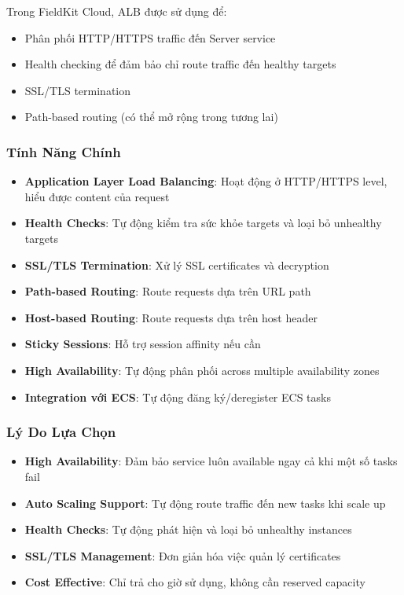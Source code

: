 Trong FieldKit Cloud, ALB được sử dụng để:
\begin{itemize}
    \item Phân phối HTTP/HTTPS traffic đến Server service
    \item Health checking để đảm bảo chỉ route traffic đến healthy targets
    \item SSL/TLS termination
    \item Path-based routing (có thể mở rộng trong tương lai)
\end{itemize}

\subsubsection{Tính Năng Chính}

\begin{itemize}
    \item \textbf{Application Layer Load Balancing}: Hoạt động ở HTTP/HTTPS level, hiểu được content của request
    \item \textbf{Health Checks}: Tự động kiểm tra sức khỏe targets và loại bỏ unhealthy targets
    \item \textbf{SSL/TLS Termination}: Xử lý SSL certificates và decryption
    \item \textbf{Path-based Routing}: Route requests dựa trên URL path
    \item \textbf{Host-based Routing}: Route requests dựa trên host header
    \item \textbf{Sticky Sessions}: Hỗ trợ session affinity nếu cần
    \item \textbf{High Availability}: Tự động phân phối across multiple availability zones
    \item \textbf{Integration với ECS}: Tự động đăng ký/deregister ECS tasks
\end{itemize}

\subsubsection{Lý Do Lựa Chọn}

\begin{itemize}
    \item \textbf{High Availability}: Đảm bảo service luôn available ngay cả khi một số tasks fail
    \item \textbf{Auto Scaling Support}: Tự động route traffic đến new tasks khi scale up
    \item \textbf{Health Checks}: Tự động phát hiện và loại bỏ unhealthy instances
    \item \textbf{SSL/TLS Management}: Đơn giản hóa việc quản lý certificates
    \item \textbf{Cost Effective}: Chỉ trả cho giờ sử dụng, không cần reserved capacity
\end{itemize}


